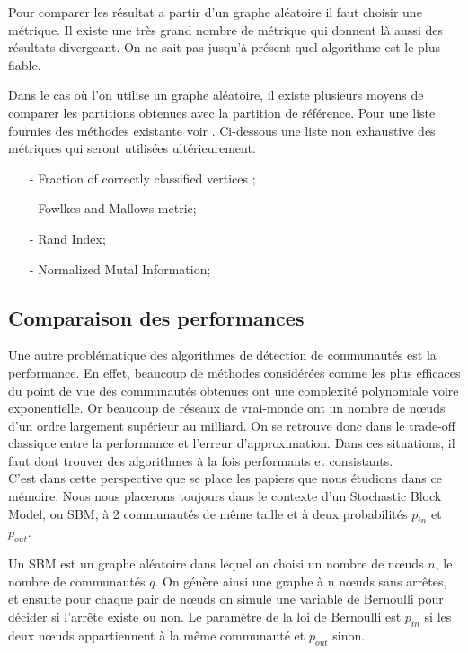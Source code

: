 Pour comparer les résultat a partir d'un graphe aléatoire il faut choisir une métrique.
Il existe une très grand nombre de métrique qui donnent là aussi des résultats divergeant.
On ne sait pas jusqu'à présent quel algorithme est le plus fiable.

Dans le cas où l'on utilise un graphe aléatoire, il existe plusieurs moyens de comparer les partitions obtenues avec la partition de référence.  
Pour une liste fournies des méthodes existante voir \cite[p.77-79]{Community_detection_in_graphs}.
Ci-dessous une liste non exhaustive des métriques qui seront utilisées ultérieurement.
\begin{itemize}
	\item[-] Fraction of correctly classified vertices ; 
	\item[-] Fowlkes and Mallows metric; 
	\item[-] Rand Index; 
	\item[-] Normalized Mutal Information; 
\end{itemize}

\subsection{Comparaison des performances}
Une autre problématique des algorithmes de détection de communautés est la performance.
En effet, beaucoup de méthodes considérées comme les plus efficaces du point de vue des communautés obtenues ont une complexité polynomiale voire exponentielle.
Or beaucoup de réseaux de vrai-monde ont un nombre de nœuds d'un ordre largement supérieur au milliard. 
On se retrouve donc dans le trade-off classique entre la performance et l'erreur d'approximation. 
Dans ces situations, il faut dont trouver des algorithmes à la fois performants et consistants.\\

C'est dans cette perspective que se place les papiers que nous étudions dans ce mémoire.
Nous nous placerons toujours dans le contexte d'un Stochastic Block Model, ou SBM, à 2 communautés de même taille et à deux probabilités $p_{in}$ et $p_{out}$.

Un SBM est un graphe aléatoire dans lequel on choisi un nombre de nœuds $n$, le nombre de communautés $q$. 
On génère ainsi une graphe à n nœuds sans arrêtes, et ensuite pour chaque pair de nœuds on simule une variable de Bernoulli pour décider si l’arrête existe ou non.
Le paramètre de la loi de Bernoulli est $p_{in}$ si les deux nœuds appartiennent à la même communauté et $p_{out}$ sinon.

